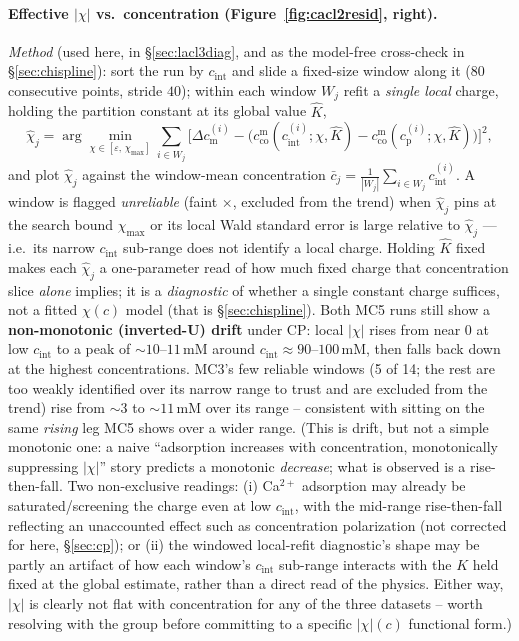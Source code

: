 \documentclass[11pt]{article}
\newcommand{\note}[1]{{\color{blue}\textsf{(#1)}}}
\newcommand{\cm}[1]{{c^{\mathrm{m}}_{#1}}}
\newcommand{\co}{\mathrm{co}}
\newcommand{\cint}{c_{\mathrm{int}}}
\newcommand{\cp}{c_{\mathrm{p}}}
\begin{document}
\paragraph{Effective $|\chi|$ vs.\ concentration (Figure~\ref{fig:cacl2resid},
right).} \emph{Method} (used here, in \S\ref{sec:lacl3diag}, and as the
model-free cross-check in \S\ref{sec:chispline}): sort the run by $\cint$ and
slide a fixed-size window along it ($80$ consecutive points, stride $40$); within
each window $W_j$ refit a \emph{single local} charge, holding the partition
constant at its global value $\hat K$,
\begin{equation}
  \hat\chi_j=\arg\min_{\chi\in[\varepsilon,\,\chi_{\max}]}
  \sum_{i\in W_j}\Big[\Delta c_{\mathrm m}^{(i)}
   -\big(\cm{\co}(\cint^{(i)};\chi,\hat K)-\cm{\co}(\cp^{(i)};\chi,\hat K)\big)\Big]^2,
  \label{eq:effchi}
\end{equation}
and plot $\hat\chi_j$ against the window-mean concentration
$\bar c_j=\tfrac{1}{|W_j|}\sum_{i\in W_j}\cint^{(i)}$. A window is flagged
\emph{unreliable} (faint $\times$, excluded from the trend) when $\hat\chi_j$
pins at the search bound $\chi_{\max}$ or its local Wald standard error is large
relative to $\hat\chi_j$ --- i.e.\ its narrow $\cint$ sub-range does not identify
a local charge. Holding $\hat K$ fixed makes each $\hat\chi_j$ a one-parameter
read of how much fixed charge that concentration slice \emph{alone} implies; it
is a \emph{diagnostic} of whether a single constant charge suffices, not a fitted
$\chi(c)$ model (that is \S\ref{sec:chispline}). Both MC5 runs still show a
\textbf{non-monotonic (inverted-U) drift}
under CP: local $|\chi|$ rises from near 0 at low $\cint$ to a peak of
$\sim\!10$--$11$\,mM around $\cint\approx90$--$100$\,mM, then falls back down at
the highest concentrations. MC3's few reliable windows (5 of 14; the rest are
too weakly identified over its narrow range to trust and are excluded from the
trend) rise from $\sim\!3$ to $\sim\!11$\,mM over its range -- consistent with
sitting on the same \emph{rising} leg MC5 shows over a wider range. \note{This
is drift, but not a simple monotonic one: a naive ``adsorption increases with
concentration, monotonically suppressing $|\chi|$'' story predicts a monotonic
\emph{decrease}; what is observed is a rise-then-fall. Two non-exclusive
readings: (i) Ca$^{2+}$ adsorption may already be saturated/screening the
charge even at low $\cint$, with the mid-range rise-then-fall reflecting an
unaccounted effect such as concentration polarization (not corrected for
\ce{CaCl2} here, \S\ref{sec:cp}); or (ii) the windowed local-refit
diagnostic's shape may be partly an artifact of how each window's $\cint$
sub-range interacts with the $K$ held fixed at the global estimate, rather
than a direct read of the physics. Either way, $|\chi|$ is clearly not flat
with concentration for any of the three datasets -- worth resolving with the
group before committing to a specific $|\chi|(c)$ functional form.}
\end{document}
